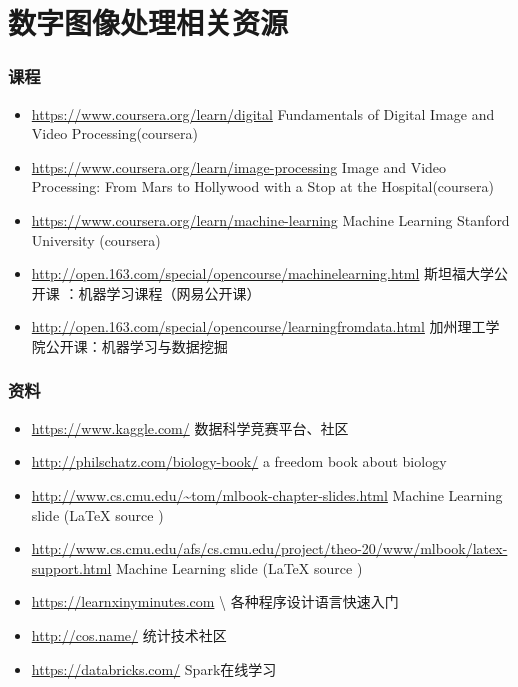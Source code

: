 \documentclass{beamer}
\begin{document}
\section{数字图像处理相关资源}
\label{sec-4}
\begin{frame}
\frametitle{课程}
\label{sec-4-1}

\begin{itemize}
\item \href{https://www.coursera.org/learn/digital}{https://www.coursera.org/learn/digital}  Fundamentals of Digital Image and Video Processing(coursera)
\item \href{https://www.coursera.org/learn/image-processing}{https://www.coursera.org/learn/image-processing}  Image and Video Processing: From Mars to Hollywood with a Stop at the Hospital(coursera)
\item \href{https://www.coursera.org/learn/machine-learning}{https://www.coursera.org/learn/machine-learning}  Machine Learning Stanford University (coursera)
\item \href{http://open.163.com/special/opencourse/machinelearning.html}{http://open.163.com/special/opencourse/machinelearning.html}  斯坦福大学公开课 ：机器学习课程（网易公开课）
\item \href{http://open.163.com/special/opencourse/learningfromdata.html}{http://open.163.com/special/opencourse/learningfromdata.html} 加州理工学院公开课：机器学习与数据挖掘
\end{itemize}
\end{frame}
\begin{frame}
\frametitle{资料}
\label{sec-4-2}

\begin{itemize}
\item \href{https://www.kaggle.com/}{https://www.kaggle.com/}
    数据科学竞赛平台、社区
\item \href{http://philschatz.com/biology-book/}{http://philschatz.com/biology-book/}  
    a  freedom book about biology
\item \href{http://www.cs.cmu.edu/~tom/mlbook-chapter-slides.html}{http://www.cs.cmu.edu/\textasciitilde tom/mlbook-chapter-slides.html}
    Machine Learning slide (\LaTeX{} source )
\item \href{http://www.cs.cmu.edu/afs/cs.cmu.edu/project/theo-20/www/mlbook/latex-support.html}{http://www.cs.cmu.edu/afs/cs.cmu.edu/project/theo-20/www/mlbook/latex-support.html} 
    Machine Learning slide (\LaTeX{} source )
\item \href{https://learnxinyminutes.com}{https://learnxinyminutes.com}  \textbackslash{}
    各种程序设计语言快速入门
\item \href{http://cos.name/}{http://cos.name/}
    统计技术社区
\item \href{https://databricks.com/}{https://databricks.com/}
    Spark在线学习
\end{itemize}
\end{frame}
\end{document}
